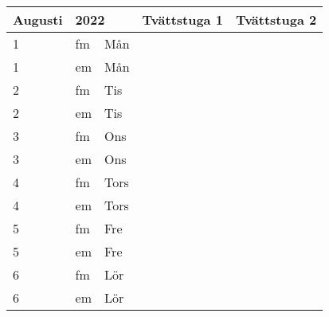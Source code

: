 \documentclass[a4paper]{article}
\begin{document}
\begin{table}[ht!]
\vspace{-10em}%
\normalsize
\begin{tabular}{lllp{7cm}p{7cm}}
\textbf{Augusti}           & \multicolumn{2}{l}{\textbf{2022}}                  & \textbf{Tvättstuga 1} & \textbf{Tvättstuga 2} \\ \hline    

\multicolumn{1}{|l|}{1} & \multicolumn{1}{l|}{fm} & \multicolumn{1}{l|}{Mån} & \multicolumn{1}{l|}{} & \multicolumn{1}{l|}{} \\ \hline
\multicolumn{1}{|l|}{1} & \multicolumn{1}{l|}{em} & \multicolumn{1}{l|}{Mån} & \multicolumn{1}{l|}{} & \multicolumn{1}{l|}{} \\ \hline    

\multicolumn{1}{|l|}{2} & \multicolumn{1}{l|}{fm} & \multicolumn{1}{l|}{Tis} & \multicolumn{1}{l|}{} & \multicolumn{1}{l|}{} \\ \hline
\multicolumn{1}{|l|}{2} & \multicolumn{1}{l|}{em} & \multicolumn{1}{l|}{Tis} & \multicolumn{1}{l|}{} & \multicolumn{1}{l|}{} \\ \hline    

\multicolumn{1}{|l|}{3} & \multicolumn{1}{l|}{fm} & \multicolumn{1}{l|}{Ons} & \multicolumn{1}{l|}{} & \multicolumn{1}{l|}{} \\ \hline
\multicolumn{1}{|l|}{3} & \multicolumn{1}{l|}{em} & \multicolumn{1}{l|}{Ons} & \multicolumn{1}{l|}{} & \multicolumn{1}{l|}{} \\ \hline    

\multicolumn{1}{|l|}{4} & \multicolumn{1}{l|}{fm} & \multicolumn{1}{l|}{Tors} & \multicolumn{1}{l|}{} & \multicolumn{1}{l|}{} \\ \hline
\multicolumn{1}{|l|}{4} & \multicolumn{1}{l|}{em} & \multicolumn{1}{l|}{Tors} & \multicolumn{1}{l|}{} & \multicolumn{1}{l|}{} \\ \hline    

\multicolumn{1}{|l|}{5} & \multicolumn{1}{l|}{fm} & \multicolumn{1}{l|}{Fre} & \multicolumn{1}{l|}{} & \multicolumn{1}{l|}{} \\ \hline
\multicolumn{1}{|l|}{5} & \multicolumn{1}{l|}{em} & \multicolumn{1}{l|}{Fre} & \multicolumn{1}{l|}{} & \multicolumn{1}{l|}{} \\ \hline    

\multicolumn{1}{|l|}{6} & \multicolumn{1}{l|}{fm} & \multicolumn{1}{l|}{Lör} & \multicolumn{1}{l|}{} & \multicolumn{1}{l|}{} \\ \hline
\multicolumn{1}{|l|}{6} & \multicolumn{1}{l|}{em} & \multicolumn{1}{l|}{Lör} & \multicolumn{1}{l|}{} & \multicolumn{1}{l|}{} \\ \hline    


\end{tabular}
\end{table}
\end{document}
